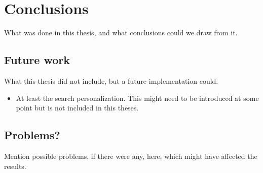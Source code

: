 \chapter{Conclusions}
What was done in this thesis, and what conclusions could we draw from it.



\section{Future work}
What this thesis did not include, but a future implementation could.

\begin{itemize}
    \item At least the search personalization. 
    This might need to be introduced at some point but is not included in this theses.
\end{itemize}



\section{Problems?}
Mention possible problems, if there were any, here, which might have affected the results.


